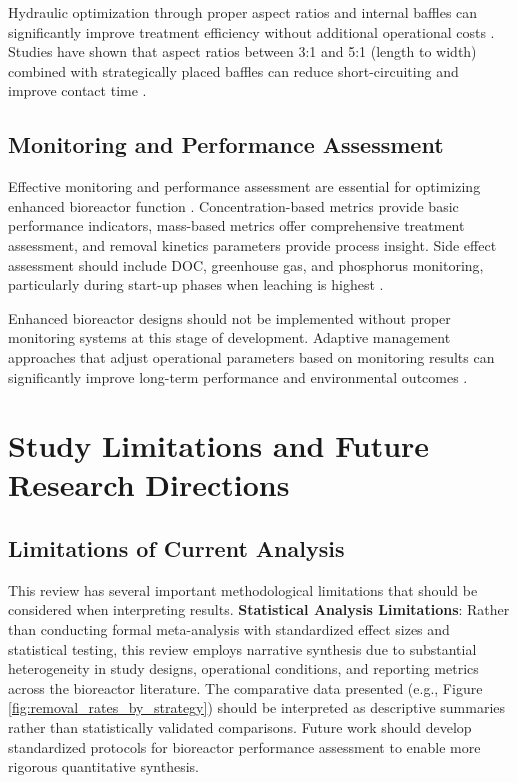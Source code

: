 \documentclass[12pt,a4paper]{article}
\begin{document}
Hydraulic optimization through proper aspect ratios and internal baffles can significantly improve treatment efficiency without additional operational costs \citep{RN309}. Studies have shown that aspect ratios between 3:1 and 5:1 (length to width) combined with strategically placed baffles can reduce short-circuiting and improve contact time \citep{RN309}.

\subsection{Monitoring and Performance Assessment}

Effective monitoring and performance assessment are essential for optimizing enhanced bioreactor function \citep{RN310, RN312}. Concentration-based metrics provide basic performance indicators, mass-based metrics offer comprehensive treatment assessment, and removal kinetics parameters provide process insight. Side effect assessment should include DOC, greenhouse gas, and phosphorus monitoring, particularly during start-up phases when leaching is highest \citep{RN291, RN1181}.

Enhanced bioreactor designs should not be implemented without proper monitoring systems at this stage of development. Adaptive management approaches that adjust operational parameters based on monitoring results can significantly improve long-term performance and environmental outcomes \citep{RN310}.

\section{Study Limitations and Future Research Directions}

\subsection{Limitations of Current Analysis}

This review has several important methodological limitations that should be considered when interpreting results. \textbf{Statistical Analysis Limitations}: Rather than conducting formal meta-analysis with standardized effect sizes and statistical testing, this review employs narrative synthesis due to substantial heterogeneity in study designs, operational conditions, and reporting metrics across the bioreactor literature. The comparative data presented (e.g., Figure \ref{fig:removal_rates_by_strategy}) should be interpreted as descriptive summaries rather than statistically validated comparisons. Future work should develop standardized protocols for bioreactor performance assessment to enable more rigorous quantitative synthesis.
\end{document}
